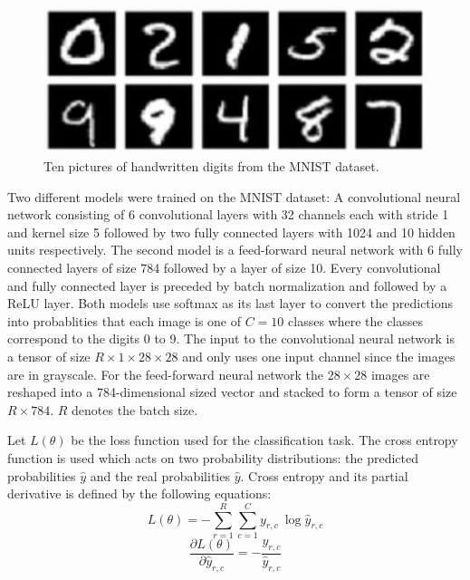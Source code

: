 \documentclass[a4paper, twoside]{article}
\newcommand*{\pd}[2]{\ensuremath{\dfrac{\partial #1}{\partial #2}}}
\begin{document}
\begin{figure}[h]
	\centering
  		\includegraphics[scale=1]{mnist.png}
  	\caption{Ten pictures of handwritten digits from the MNIST dataset. \cite{MNIST}} \label{figMNIST}
\end{figure}

Two different models were trained on the MNIST dataset: A convolutional neural network consisting of 6 convolutional layers with 32 channels each with stride 1 and kernel size 5 followed by two fully connected layers with 1024 and 10 hidden units respectively. The second model is a feed-forward neural network with 6 fully connected layers of size 784 followed by a layer of size 10. Every convolutional and fully connected layer is preceded by batch normalization and followed by a ReLU layer. Both models use softmax as its last layer to convert the predictions into probablities that each image is one of $C=10$ classes where the classes correspond to the digits 0 to 9. The input to the convolutional neural network is a tensor of size $R \times 1 \times 28 \times 28$ and only uses one input channel since the images are in grayscale. For the feed-forward neural network the $28 \times 28$ images are reshaped into a 784-dimensional sized vector and stacked to form a tensor of size $R \times 784$. $R$ denotes the batch size.

Let $L(\theta)$ be the loss function used for the classification task. The cross entropy function is used which acts on two probability distributions: the predicted probabilities $\hat{y}$ and the real probabilities $\hat{y}$. Cross entropy and its partial derivative is defined by the following equations: \cite{cs231n} \cite{notesonbackprop}
\begin{equation}\label{crossentropy}
L(\theta) = - \sum^{R }_{r=1} \sum^{C }_{c=1}y_{r,c} \ \log{\hat{y}_{r,c}}
\end{equation}
\begin{equation}\label{dydxcrossentropy}
\pd{L(\theta)}{\hat{y}_{r,c}} = - \frac{y_{r,c}}{\hat{y}_{r,c}}
\end{equation}
\end{document}
